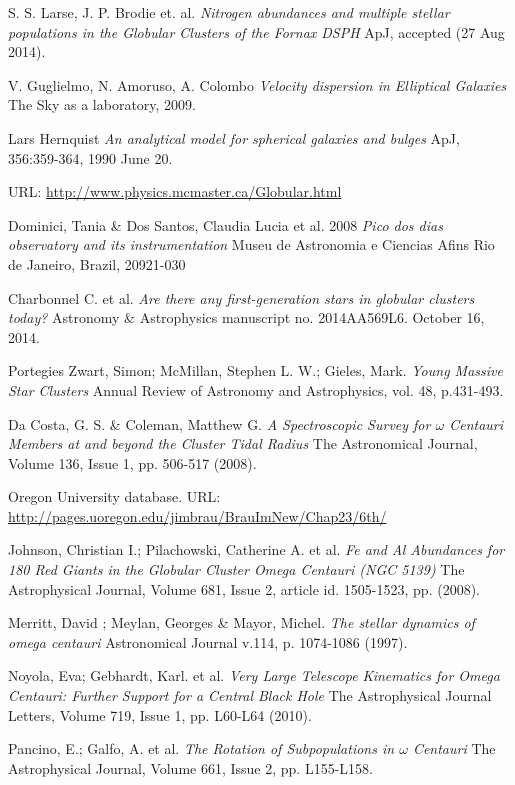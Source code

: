 \documentclass[a4paper, 11pt, oneside]{Thesis}  %
\begin{document}
\begin{thebibliography}{9}
S. S. Larse, J. P. Brodie et. al.
\textit{Nitrogen abundances and multiple stellar populations in the Globular Clusters of the Fornax DSPH}
ApJ, accepted (27 Aug 2014).

V. Guglielmo, N. Amoruso, A. Colombo
\textit{Velocity dispersion in Elliptical Galaxies}
The Sky as a laboratory, 2009.

Lars Hernquist
\textit{An analytical model for spherical galaxies and bulges}
ApJ, 356:359-364, 1990 June 20.

URL: \url{http://www.physics.mcmaster.ca/Globular.html}

Dominici, Tania \& Dos Santos, Claudia Lucia et al. 2008
\textit{Pico dos dias observatory and its instrumentation}
Museu de Astronomia e Ciencias Afins Rio de Janeiro, Brazil, 20921-030

Charbonnel C. et al.
\textit{Are there any first-generation stars in globular clusters today?}
Astronomy \& Astrophysics manuscript no. 2014AA569L6. October 16, 2014.

Portegies Zwart, Simon; McMillan, Stephen L. W.; Gieles, Mark.
\textit{Young Massive Star Clusters}
Annual Review of Astronomy and Astrophysics, vol. 48, p.431-493.

Da Costa, G. S. \& Coleman, Matthew G.
\textit{A Spectroscopic Survey for $\omega$ Centauri Members at and beyond the Cluster Tidal Radius}
The Astronomical Journal, Volume 136, Issue 1, pp. 506-517 (2008).

Oregon University database.
URL: \url{http://pages.uoregon.edu/jimbrau/BrauImNew/Chap23/6th/}

Johnson, Christian I.; Pilachowski, Catherine A. et al.
\textit{Fe and Al Abundances for 180 Red Giants in the Globular Cluster Omega Centauri (NGC 5139)}
The Astrophysical Journal, Volume 681, Issue 2, article id. 1505-1523, pp. (2008).

Merritt, David ; Meylan, Georges \& Mayor, Michel.
\textit{The stellar dynamics of omega centauri}
Astronomical Journal v.114, p. 1074-1086 (1997).

Noyola, Eva; Gebhardt, Karl. et al.
\textit{Very Large Telescope Kinematics for Omega Centauri: Further Support for a Central Black Hole}
The Astrophysical Journal Letters, Volume 719, Issue 1, pp. L60-L64 (2010).

Pancino, E.; Galfo, A. et al.
\textit{The Rotation of Subpopulations in $\omega$ Centauri}
The Astrophysical Journal, Volume 661, Issue 2, pp. L155-L158.


\end{thebibliography}
\end{document}
